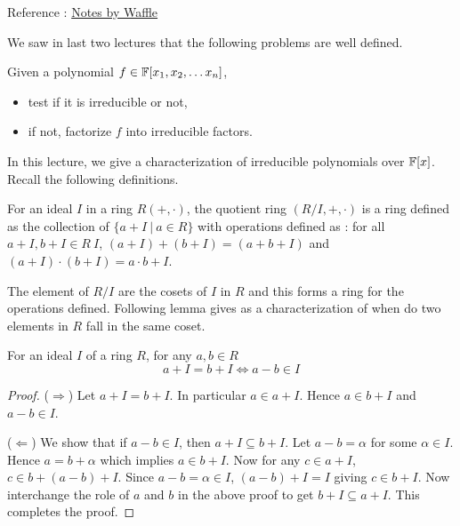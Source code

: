Reference : \href{http://math.harvard.edu/~waffle/ufds2.pdf}{Notes by Waffle}


We saw in last two lectures that the following problems are well defined.
\begin{problem}
	Given a polynomial $f \in {\mathbb{F}[x_1,x_2, \ldots x_n]}$, 
	\begin{itemize}
		\item test if it is irreducible or not,
		\item if not, factorize $f$ into irreducible factors.
	\end{itemize}
\end{problem}

In this lecture, we give a characterization of irreducible polynomials over
${\mathbb{F}}[x]$. Recall the following definitions.

\begin{definition}
	For an ideal $I$ in a ring $R(+,\cdot)$, the quotient ring $(R/I, +
	,\cdot)$ is a ring defined as the collection of $\{a+I ~|~ a \in R\}$
	with operations defined as : for all $a+I, b+I \in R \ I$,
	$(a+I)+(b+I) = (a+b+ I)$ and $(a+I) \cdot (b+I) = a\cdot b+I$.
\end{definition}
The element of $R/I$ are the cosets of $I$ in $R$ and this forms a ring for
the operations defined.  Following lemma gives as a characterization of when
do two elements in $R$ fall in the same coset.
\begin{lemma} \label{lem:mem-ideal}
	For an ideal $I$ of a ring $R$, for any $a,b \in R$ 
	\[ a+I = b + I \iff a-b \in I \]
\end{lemma}
\begin{proof}
	($\Longrightarrow$) Let $a+I = b+I$. In particular $a \in a+I$. Hence
	$a \in b+I$ and $a-b \in I$.

	($\Longleftarrow$) We show that if $a-b \in I$, then $a+I \subseteq
	b+I$. Let $a-b = \alpha$ for some $\alpha \in I$. Hence $a = b +
	\alpha$ which implies $a \in b+I$. Now for any $c \in a+I$, $c \in
	b+(a-b)+I$. Since $a-b = \alpha \in I$, $(a-b)+I = I$ giving $c \in
	b+I$. Now interchange the role of $a$ and $b$ in the above proof to
	get $b+I \subseteq a+I$. This completes the proof.
\end{proof}

